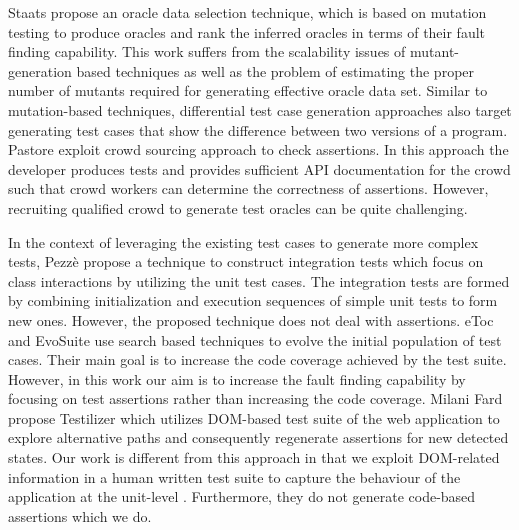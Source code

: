 Staats \etal \cite{staats:icse12} propose an oracle data selection technique, which is based on mutation testing to produce oracles and rank the inferred oracles in terms of their fault finding capability. This work suffers from the scalability issues of mutant-generation based techniques as well as the problem of estimating the proper number of mutants required for generating effective oracle data set.
Similar to mutation-based techniques, differential test case generation approaches \cite{taneja:ase08, elbaum:tse09} also target generating test cases that show the difference between two versions of a program. %
Pastore \etal \cite{pastore:icst13} exploit crowd sourcing approach to check assertions. In this approach the developer produces tests and provides sufficient API documentation for the crowd such that crowd workers can determine the correctness of assertions. However, recruiting qualified crowd to generate test oracles can be quite challenging.

In the context of leveraging the existing test cases to generate more complex tests, Pezz\`e \etal \cite{pezze:icst13} propose a technique to construct integration tests which focus on class interactions by utilizing the unit test cases. 
The integration tests are formed by combining initialization and execution sequences of simple unit tests to form new ones. However, the proposed technique does not deal with assertions.
eToc \cite{tonella:issta04} and EvoSuite \cite{fraser:icst12} use search based techniques to evolve the initial population of test cases. Their main goal is to increase the code coverage achieved by the test suite. However, in this work our aim is to increase the fault finding capability by focusing on test assertions rather than increasing the code coverage.
Milani Fard \etal \cite{milanifard:ase14} propose Testilizer which utilizes DOM-based test suite of the web application to explore alternative paths and consequently regenerate assertions for new detected states. Our work is different from this approach in that we exploit DOM-related information in a human written test suite to capture the behaviour of the application at the unit-level \javascript. Furthermore, they do not generate code-based assertions which we do.